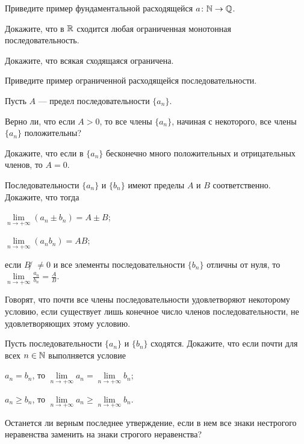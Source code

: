 \documentclass[a4paper, 12pt, num=30]{listok}
\begin{document}
\begin{problem}
    Приведите пример фундаментальной расходящейся $a \colon \mathbb{N} \to \mathbb{Q}$.
\end{problem}
\begin{problem}
    Докажите, что в $\mathbb{R}$ сходится любая ограниченная монотонная последовательность.
\end{problem}
\begin{problem}
    \begin{probparts}
        \item Докажите, что всякая сходящаяся ограничена.
        \item Приведите пример ограниченной расходящейся последовательности.
    \end{probparts}
\end{problem}
\begin{problem}
    Пусть $A$ --- предел последовательности $\{a_n\}$.
    \begin{probparts}
        \item Верно ли, что если $A > 0$, то все члены $\{a_n\}$, начиная с некоторого, все члены $\{a_n\}$ положительны?
        \item Докажите, что если в $\{a_n\}$ бесконечно много положительных и отрицательных членов, то $A = 0$.
    \end{probparts}
\end{problem}
\begin{problem}
    Последовательности $\{a_n\}$ и $\{b_n\}$ имеют пределы $A$ и $B$ соответственно.
    Докажите, что тогда
    \begin{probenum}
        \item $\lim\limits_{n \to +\infty} (a_n \pm b_n) = A \pm B$;
        \item $\lim\limits_{n \to +\infty} (a_n  b_n) = A B$;
        \item если $B ̸\ne 0$ и все элементы последовательности $\{b_n\}$ отличны от нуля, то
            $\lim\limits_{n \to +\infty} \frac{a_n}{b_n} = \frac AB$.
    \end{probenum}
\end{problem}
\begin{definition}
    Говорят, что почти все члены последовательности удовлетворяют некоторому условию,
    если существует лишь конечное число членов последовательности, не удовлетворяющих этому условию.
\end{definition}
\begin{problem}
    Пусть последовательности $\{a_n\}$ и $\{b_n\}$ сходятся.
    Докажите, что если почти для всех $n \in \mathbb{N}$ выполняется условие
    \begin{probparts}
        \item $a_n = b_n$, то $\lim\limits_{n \to +\infty} a_n = \lim\limits_{n \to +\infty} b_n$;
        \item $a_n \ge b_n$, то $\lim\limits_{n \to +\infty} a_n \ge \lim\limits_{n \to +\infty} b_n$.
        \item Останется ли верным последнее утверждение, если в нем все знаки нестрогого неравенства заменить на знаки строгого неравенства?
    \end{probparts}
\end{problem}
\end{document}
